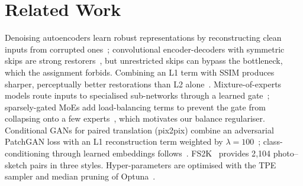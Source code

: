 \documentclass[conference]{IEEEtran}
\begin{document}
\section{Related Work}
Denoising autoencoders learn robust representations by reconstructing clean inputs from corrupted ones~\cite{vincent2008}; convolutional encoder-decoders with symmetric skips are strong restorers~\cite{mao2016}, but unrestricted skips can bypass the bottleneck, which the assignment forbids. Combining an L1 term with SSIM produces sharper, perceptually better restorations than L2 alone~\cite{zhao2017}. Mixture-of-experts models route inputs to specialised sub-networks through a learned gate~\cite{jacobs1991}; sparsely-gated MoEs add load-balancing terms to prevent the gate from collapsing onto a few experts~\cite{shazeer2017,fedus2022}, which motivates our balance regulariser. Conditional GANs for paired translation (pix2pix) combine an adversarial PatchGAN loss with an L1 reconstruction term weighted by $\lambda=100$~\cite{isola2017}; class-conditioning through learned embeddings follows~\cite{mirza2014,miyato2018}. FS2K~\cite{fan2022} provides 2{,}104 photo--sketch pairs in three styles. Hyper-parameters are optimised with the TPE sampler and median pruning of Optuna~\cite{akiba2019}.
\end{document}
